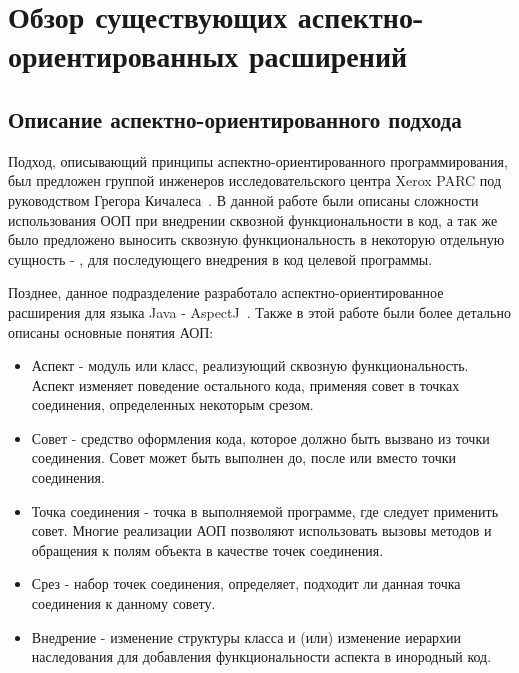 \chapter{Обзор существующих аспектно-ориентированных расширений}

\section{Описание аспектно-ориентированного подхода}
Подход, описывающий принципы аспектно-ориентированного программирования, был
предложен группой инженеров исследовательского центра Xerox PARC под
руководством Грегора Кичалеса~\cite{kiczales_aop}.
В данной работе были описаны сложности использования ООП при внедрении сквозной
функциональности в код, а так же было предложено выносить сквозную
функциональность в некоторую отдельную сущность - , для
последующего внедрения в код целевой программы.

Позднее, данное подразделение разработало аспектно-ориентированное расширения
для языка Java - AspectJ~\cite{kiczales_aspectj}.
Также в этой работе были более детально описаны основные понятия АОП:
  \begin{itemize}
    \item Аспект - модуль или класс, реализующий сквозную функциональность.
      Аспект изменяет поведение остального кода, применяя совет в точках 
      соединения, определенных некоторым срезом.
    \item Совет - средство оформления кода, которое должно быть вызвано из точки
    соединения.
    Совет может быть выполнен до, после или вместо точки соединения.
	\item Точка соединения - точка в выполняемой программе, где следует
	применить совет.
	Многие реализации АОП позволяют использовать вызовы методов и обращения к
	полям объекта в качестве точек соединения.
	\item Срез - набор точек соединения, определяет, подходит ли данная точка
	соединения к данному совету.
	\item Внедрение - изменение структуры класса и (или) изменение иерархии
	наследования для добавления функциональности аспекта в инородный код.
  \end{itemize}
	
